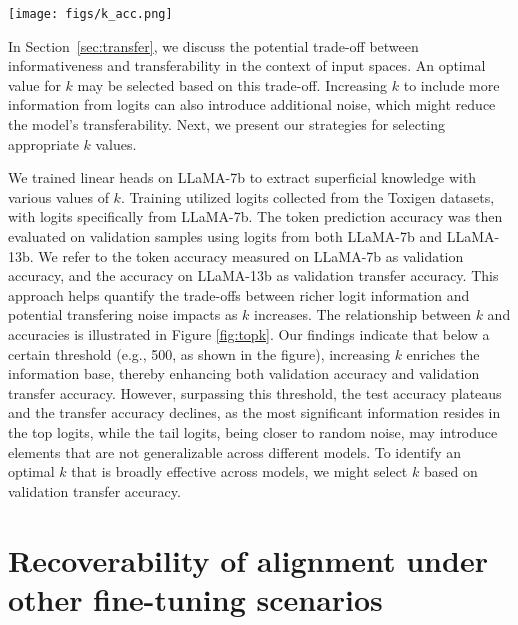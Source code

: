 \begin{figure*} %
\centering
  \texttt{[image: figs/k\_acc.png]}
  \caption{K vs Token Accuracy}
\label{fig:topk}
\end{figure*}

In Section~\ref{sec:transfer}, we discuss the potential trade-off between informativeness and transferability in the context of  input spaces. An optimal value for $k$ may be selected based on this trade-off. Increasing $k$ to include more information from logits can also introduce additional noise, which might reduce the model's transferability. Next, we present our strategies for selecting appropriate $k$ values.

We trained linear heads on LLaMA-7b to extract superficial knowledge with various values of $k$. Training utilized logits collected from the Toxigen datasets, with logits specifically from LLaMA-7b. The token prediction accuracy was then evaluated on validation samples using logits from both LLaMA-7b and LLaMA-13b. We refer to the token accuracy measured on LLaMA-7b as validation accuracy, and the accuracy on LLaMA-13b as validation transfer accuracy. This approach helps quantify the trade-offs between richer logit information and potential transfering noise impacts as $k$ increases.  The relationship between $k$ and  accuracies is illustrated in Figure \ref{fig:topk}. Our findings indicate that below a certain threshold (e.g., 500, as shown in the figure), increasing $k$ enriches the information base, thereby enhancing both validation accuracy and validation transfer accuracy. However, surpassing this threshold, the test accuracy plateaus and the transfer accuracy declines, as the most significant information resides in the top logits, while the tail logits, being closer to random noise, may introduce elements that are not generalizable across different models. To identify an optimal $k$ that is broadly effective across models, we might select $k$ based on validation transfer accuracy.


\section{Recoverability of alignment under other fine-tuning scenarios}\label{app:other_recover}

